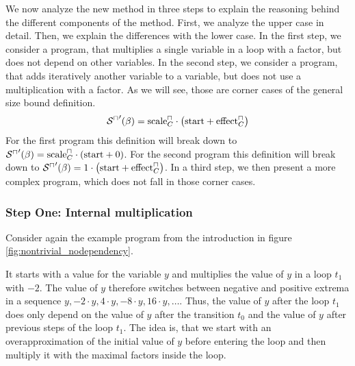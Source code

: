 We now analyze the new method in three steps to explain the reasoning behind the different components of the method.
First, we analyze the upper case in detail.
Then, we explain the differences with the lower case.
In the first step, we consider a program, that multiplies a single variable in a loop with a factor, but does not depend on other variables.
In the second step, we consider a program, that adds iteratively another variable to a variable, but does not use a multiplication with a factor.
As we will see, those are corner cases of the general size bound definition.
\[ {\mathcal{S}^\sqcap}'(\beta) = \text{scale}^\sqcap_C \cdot \left( \text{start} + \text{effect}^\sqcap_C \right) \]
For the first program this definition will break down to ${\mathcal{S}^\sqcap}'(\beta) = \text{scale}^\sqcap_C \cdot \left( \text{start} + 0 \right)$.
For the second program this definition will break down to ${\mathcal{S}^\sqcap}'(\beta) = 1 \cdot \left( \text{start} + \text{effect}^\sqcap_C \right)$.
In a third step, we then present a more complex program, which does not fall in those corner cases.

\subsubsection{Step One: Internal multiplication}

Consider again the example program from the introduction in figure \ref{fig:nontrivial_nodependency}.



It starts with a value for the variable $y$ and multiplies the value of $y$ in a loop $t_1$ with $-2$.
The value of $y$ therefore switches between negative and positive extrema in a sequence $y, -2 \cdot y, 4 \cdot y, -8 \cdot y, 16 \cdot y, \dots$.
Thus, the value of $y$ after the loop $t_1$ does only depend on the value of $y$ after the transition $t_0$ and the value of $y$ after previous steps of the loop $t_1$.
The idea is, that we start with an overapproximation of the initial value of $y$ before entering the loop and then multiply it with the maximal factors inside the loop.

